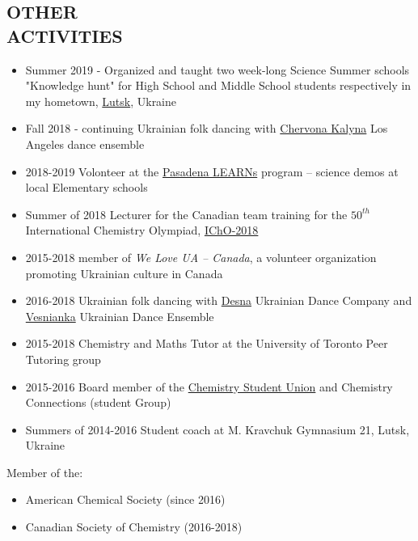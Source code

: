 \documentclass[9pt, margin]{res}
\begin{document}
\begin{resume}
\section{OTHER \\ ACTIVITIES} 

\begin{itemize}
	\item Summer 2019 - Organized and taught two week-long Science Summer schools "Knowledge hunt" for High School and Middle School students respectively in my hometown, \href{https://en.wikipedia.org/wiki/Lutsk}{Lutsk}, Ukraine
	\item Fall 2018 - continuing Ukrainian folk dancing with \href{https://kalyna.org/}{Chervona Kalyna} Los Angeles dance ensemble
	\item 2018-2019 Volonteer at the \href{https://www.caltechy.org/single-post/2019/05/01/Caltech-Y-Volunteers-Make-Science-Exciting-at-Elementary-School}{Pasadena LEARNs} program -- science demos at local Elementary schools
	\item Summer of 2018 Lecturer for the Canadian team training for the $50^{th}$ International Chemistry Olympiad, \href{https://50icho.eu}{IChO-2018} 
	\item 2015-2018 member of \textit{We Love UA -- Canada}, a volunteer organization promoting Ukrainian culture in Canada
	\item 2016-2018 Ukrainian folk dancing with \href{http://www.desna.ca}{Desna} Ukrainian Dance Company and \href{http://www.infoukes.com/vesnianka/}{Vesnianka} Ukrainian Dance Ensemble
	\item 2015-2018 Chemistry and Maths Tutor at the University of Toronto Peer Tutoring group 
	\item 2015-2016 Board member of the \href{http://csu.sa.utoronto.ca/exceutive-team-2015-2016/}{Chemistry Student Union} and Chemistry Connections (student Group)
	\item Summers of 2014-2016 Student coach at M. Kravchuk Gymnasium 21, Lutsk, Ukraine
\end{itemize}
Member of the:
\begin{itemize}
	\item American Chemical Society (since 2016)
	\item Canadian Society of Chemistry (2016-2018)
\end{itemize}

\end{resume}
\end{document}
